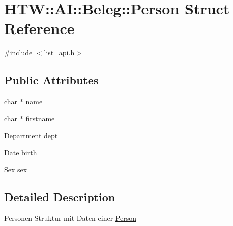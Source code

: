 \hypertarget{struct_h_t_w_1_1_a_i_1_1_beleg_1_1_person}{\section{H\-T\-W\-:\-:A\-I\-:\-:Beleg\-:\-:Person Struct Reference}
\label{struct_h_t_w_1_1_a_i_1_1_beleg_1_1_person}
}


{\ttfamily \#include $<$list\-\_\-api.\-h$>$}

\subsection*{Public Attributes}
\begin{DoxyCompactItemize}
\item 
char $\ast$ \hyperlink{struct_h_t_w_1_1_a_i_1_1_beleg_1_1_person_add1024886cb5c155493beb297bb7d771}{name}
\item 
char $\ast$ \hyperlink{struct_h_t_w_1_1_a_i_1_1_beleg_1_1_person_abf3972e47838ed214b732435d95e44ef}{firstname}
\item 
\hyperlink{namespace_h_t_w_1_1_a_i_1_1_beleg_a1131bbbd225fb53b2082a014e0f6e940}{Department} \hyperlink{struct_h_t_w_1_1_a_i_1_1_beleg_1_1_person_a3557420956ef6465a58ef2fb1c5117b1}{dept}
\item 
\hyperlink{struct_h_t_w_1_1_a_i_1_1_beleg_1_1_date}{Date} \hyperlink{struct_h_t_w_1_1_a_i_1_1_beleg_1_1_person_abec600f894ab71328c4d766c1961b9a1}{birth}
\item 
\hyperlink{namespace_h_t_w_1_1_a_i_1_1_beleg_a79f3a46a934454a934cc7ec60d4f2e2c}{Sex} \hyperlink{struct_h_t_w_1_1_a_i_1_1_beleg_1_1_person_a956a6bbc50e0b907a95f897f0e643845}{sex}
\end{DoxyCompactItemize}


\subsection{Detailed Description}
Personen-\/\-Struktur mit Daten einer \hyperlink{struct_h_t_w_1_1_a_i_1_1_beleg_1_1_person}{Person} 


